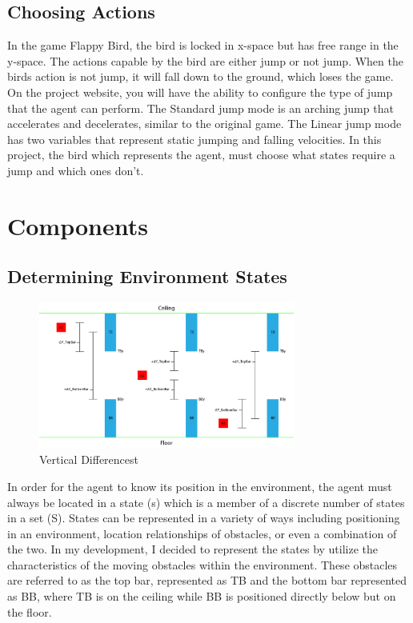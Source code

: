 \documentclass{article}
\begin{document}

\subsection{Choosing Actions}

In the game Flappy Bird, the bird is locked in x-space but has free range in the y-space. The actions capable by the bird are either jump or not jump. When the birds action is not jump, it will fall down to the ground, which loses the game. On the project website, you will have the ability to configure the type of jump that the agent can perform. The Standard jump mode is an arching jump that accelerates and decelerates, similar to the original game. The Linear jump mode has two variables that represent static jumping and falling velocities. In this project, the bird which represents the agent, must choose what states require a jump and which ones don't. 

\section{Components}

\subsection{Determining Environment States}

\begin{figure}[h]
    \centering
    \includegraphics[width=0.75\textwidth]{figure0}
    \caption{Vertical Differencest}
    \label{fig:mesh1}
\end{figure}



In order for the agent to know its position in the environment, the agent must always be located in a state (s) which is a member of a discrete number of states in a set (S). States can be represented in a variety of ways including positioning in an environment, location relationships of obstacles, or even a combination of the two. In my development, I decided to represent the states by utilize the characteristics of the moving obstacles within the environment. These obstacles are referred to as the top bar, represented as TB and the bottom bar represented as BB, where TB is on the ceiling while BB is positioned directly below but on the floor. 
\end{document}
